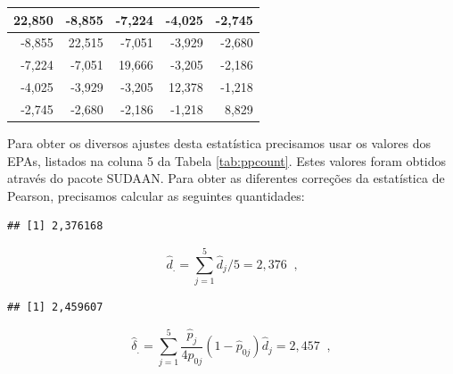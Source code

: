 \documentclass[]{book}
\newenvironment{Shaded}{\begin{snugshade}}{\end{snugshade}}
\newcommand{\KeywordTok}[1]{\textcolor[rgb]{0.13,0.29,0.53}{\textbf{#1}}}
\newcommand{\DecValTok}[1]{\textcolor[rgb]{0.00,0.00,0.81}{#1}}
\newcommand{\StringTok}[1]{\textcolor[rgb]{0.31,0.60,0.02}{#1}}
\newcommand{\OperatorTok}[1]{\textcolor[rgb]{0.81,0.36,0.00}{\textbf{#1}}}
\newcommand{\NormalTok}[1]{#1}
\theoremstyle{definition}
\theoremstyle{definition}
\theoremstyle{definition}
\theoremstyle{remark}
\begin{document}
\begin{tabular}{r|r|r|r|r}
\hline
22,850 & -8,855 & -7,224 & -4,025 & -2,745\\
\hline
-8,855 & 22,515 & -7,051 & -3,929 & -2,680\\
\hline
-7,224 & -7,051 & 19,666 & -3,205 & -2,186\\
\hline
-4,025 & -3,929 & -3,205 & 12,378 & -1,218\\
\hline
-2,745 & -2,680 & -2,186 & -1,218 & 8,829\\
\hline
\end{tabular}

Para obter os diversos ajustes desta estatística precisamos usar os
valores dos EPAs, listados na coluna 5 da Tabela \ref{tab:ppcount}.
Estes valores foram obtidos através do pacote SUDAAN. Para obter as
diferentes correções da estatística de Pearson, precisamos calcular as
seguintes quantidades:

\begin{Shaded}
\end{Shaded}

\begin{verbatim}
## [1] 2,376168
\end{verbatim}

\[
\hat{d}_{.}=\sum_{j=1}^{5}\hat{d}_{j}/5=2,376\;\;\mbox{,} 
\]

\begin{Shaded}
\end{Shaded}

\begin{verbatim}
## [1] 2,459607
\end{verbatim}

\[
\hat{\delta}_{.}=\sum_{j=1}^5\frac{\hat{p}_{j}}{4p_{0j}}
\left( 1-\hat{p}_{0j}\right) \hat{d}_{j}=2,457\;\;, 
\]
\end{document}
